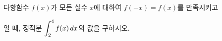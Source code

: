 다항함수 $f(x)$가 모든 실수 $x$에 대하여 $f(-x)=f(x)$를 만족시키고 \par\smallskip{}\par\smallskip\noindent 일 때, 정적분 $\displaystyle\int_{2}^{4}f(x)\mkern3mu dx$의 값을 구하시오.

